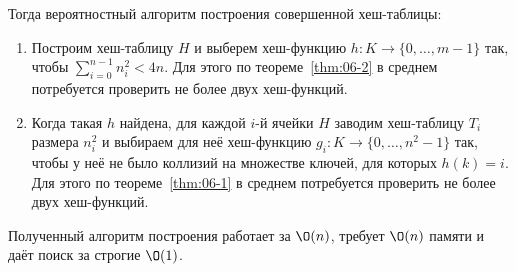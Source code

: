 Тогда вероятностный алгоритм
построения совершенной хеш-таблицы:
\begin{enumerate}
    \item Построим хеш-таблицу $H$ и выберем хеш-функцию
    $h : K \to \{0, \ldots, m - 1\}$
    так, чтобы $\sum_{i=0}^{n-1} n_i^2 < 4n$.
    Для этого по теореме~\ref{thm:06-2} в среднем потребуется
    проверить не более двух хеш-функций.

    \item Когда такая $h$ найдена, для каждой $i$-й ячейки $H$
    заводим хеш-таблицу $T_i$ размера $n_i^2$
    и выбираем для неё хеш-функцию $g_i : K \to \{0, \ldots, n^2 - 1\}$
    так, чтобы у неё не было коллизий на множестве ключей,
    для которых $h(k) = i$.
    Для этого по теореме~\ref{thm:06-1} в среднем потребуется
    проверить не более двух хеш-функций.
\end{enumerate}

Полученный алгоритм построения работает за $\O(n)$,
требует $\O(n)$ памяти и даёт поиск за строгие $\O(1)$.
